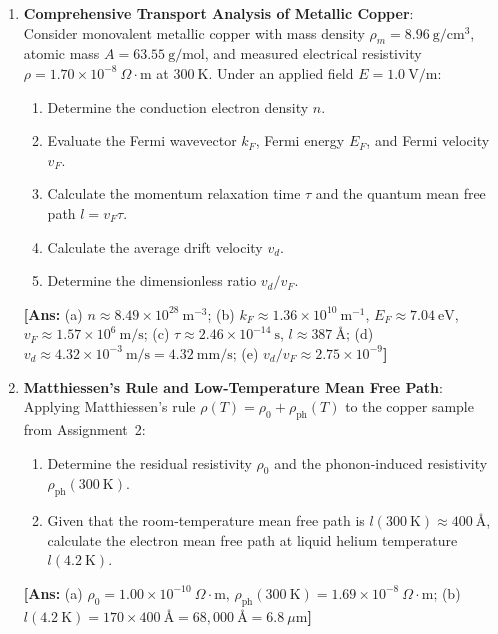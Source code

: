 \documentclass[11pt,a4paper]{article}
\begin{document}
\begin{enumerate}[label=\textbf{\arabic*.}, leftmargin=*]
    \item \textbf{Comprehensive Transport Analysis of Metallic Copper}:\\
    Consider monovalent metallic copper with mass density $\rho_m = 8.96\ \mathrm{g/cm^3}$, atomic mass $A = 63.55\ \mathrm{g/mol}$, and measured electrical resistivity $\rho = 1.70 \times 10^{-8}\ \Omega\cdot\mathrm{m}$ at $300\ \mathrm{K}$. Under an applied field $E = 1.0\ \mathrm{V/m}$:
    \begin{enumerate}[label=(\alph*)]
        \item Determine the conduction electron density $n$.
        \item Evaluate the Fermi wavevector $k_F$, Fermi energy $E_F$, and Fermi velocity $v_F$.
        \item Calculate the momentum relaxation time $\tau$ and the quantum mean free path $l = v_F \tau$.
        \item Calculate the average drift velocity $v_d$.
        \item Determine the dimensionless ratio $v_d / v_F$.
    \end{enumerate}
    \textbf{[Ans:} (a) $n \approx 8.49 \times 10^{28}\ \mathrm{m^{-3}}$; (b) $k_F \approx 1.36 \times 10^{10}\ \mathrm{m^{-1}}$, $E_F \approx 7.04\ \mathrm{eV}$, $v_F \approx 1.57 \times 10^6\ \mathrm{m/s}$; (c) $\tau \approx 2.46 \times 10^{-14}\ \mathrm{s}$, $l \approx 387\ \text{\AA}$; (d) $v_d \approx 4.32 \times 10^{-3}\ \mathrm{m/s} = 4.32\ \mathrm{mm/s}$; (e) $v_d/v_F \approx 2.75 \times 10^{-9}$\textbf{]}

    \item \textbf{Matthiessen's Rule and Low-Temperature Mean Free Path}:\\
    Applying Matthiessen's rule $\rho(T) = \rho_0 + \rho_{\mathrm{ph}}(T)$ to the copper sample from Assignment~2:
    \begin{enumerate}[label=(\alph*)]
        \item Determine the residual resistivity $\rho_0$ and the phonon-induced resistivity $\rho_{\mathrm{ph}}(300\ \mathrm{K})$.
        \item Given that the room-temperature mean free path is $l(300\ \mathrm{K}) \approx 400\ \text{\AA}$, calculate the electron mean free path at liquid helium temperature $l(4.2\ \mathrm{K})$.
    \end{enumerate}
    \textbf{[Ans:} (a) $\rho_0 = 1.00 \times 10^{-10}\ \Omega\cdot\mathrm{m}$, $\rho_{\mathrm{ph}}(300\ \mathrm{K}) = 1.69 \times 10^{-8}\ \Omega\cdot\mathrm{m}$; (b) $l(4.2\ \mathrm{K}) = 170 \times 400\ \text{\AA} = 68{,}000\ \text{\AA} = 6.8\ \mu\mathrm{m}$\textbf{]}


\end{enumerate}
\end{document}
